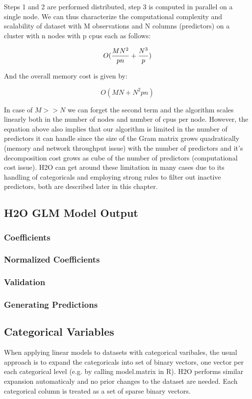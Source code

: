 \documentclass[11pt]{article}
\begin{document}
Steps 1 and 2 are performed distributed, step 3 is computed in parallel on a single node. We can thus characterize the computational complexity and scalability of dataset with M observations and N columns (predictors) on a cluster with n nodes with p cpus each as follows:

\[ O({MN^2 \over pn} + {N^3 \over p})\]

And the overall memory cost is given by:

\[ O(MN + N^2pn)\]

In case of $M >> N$ we can forget the second term and the algorithm scales linearly both in the number of nodes and number of cpus per node. However, the equation above also implies that our algorithm is limited in the number of predictors it can handle since the size of the Gram matrix grows quadratically (memory and network throughput issue) with the number of predictors and it's decomposition cost grows as cube of the number of predictors (computational cost issue). H2O can get around these limitation in many cases due to its handling of categoricals and employing strong rules to filter out inactive predictors, both are described later in this chapter.  


\subsection{H2O GLM Model Output}
\subsubsection{Coefficients}
\subsubsection{Normalized Coefficients}
\subsubsection{Validation}
\subsubsection{Generating Predictions}

\subsection{Categorical Variables}
When applying linear models to datasets with categorical varibales, the usual approach is to expand the categoricals into set of binary vectors, one vector per each categorical level (e.g. by calling model.matrix in R). H2O performs similar expansion automaticaly and no prior changes to the dataset are needed. Each categorical column is treated as a set of sparse binary vectors.
\end{document}
